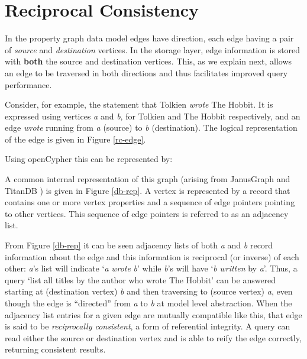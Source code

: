 \section{Reciprocal Consistency}
\label{sec:recipr-cons}

In the property graph data model edges have direction, each edge having a pair of \emph{source} and \emph{destination} vertices.
In the storage layer, edge information is stored with \textbf{both} the source and destination vertices.
This, as we explain next, allows an edge to be traversed in both directions and thus facilitates improved query performance.

Consider, for example, the statement that Tolkien \textit{wrote} The Hobbit.
It is expressed using vertices \emph{a} and \emph{b}, for Tolkien and The Hobbit respectively, and an edge \textit{wrote} running from \emph{a} (source) to \emph{b} (destination). The logical representation of the edge is given in Figure \ref{rc-edge}.

Using openCypher \cite{openCypher} this can be represented by:


A common internal representation of this graph (arising from JanusGraph \cite{janusgraph} and TitanDB \cite{TitanDB}) is given in Figure \ref{db-rep}.
A vertex is represented by a record that contains one or more vertex properties and a sequence of edge pointers pointing to other vertices.
This sequence of edge pointers is referred to as an adjacency list.

From Figure \ref{db-rep} it can be seen adjacency lists of both \emph{a} and \emph{b} record information about the edge and this information is reciprocal (or inverse) of each other: \emph{a}'s list will indicate `\emph{a} \emph{wrote} \emph{b}' while \emph{b}'s will have `\emph{b} \emph{written} by \emph{a}'.
Thus, a query `list all titles by the author who wrote The Hobbit' can be answered starting at (destination vertex) \emph{b} and then traversing to (source vertex) \emph{a}, even though the edge is ``directed'' from \emph{a} to \emph{b} at model level abstraction.
When the adjacency list entries for a given edge are mutually compatible like this, that edge is said to be \emph{reciprocally consistent}, a form of referential integrity.
A query can read either the source or destination vertex and is able to reify the edge correctly, returning consistent results.

